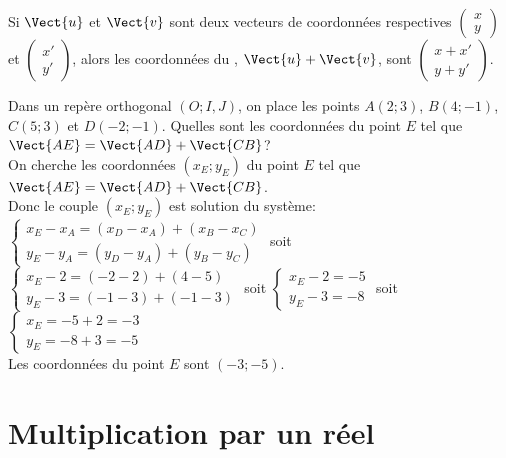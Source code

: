 \documentclass{book}
\begin{document}
\begin{Proposition}
Si $\Vect{u}$ et $\Vect{v}$ sont deux vecteurs de coordonnées respectives $\left (\begin{array}{c}
x\\y
\end{array}\right)$ et 
$\left(\begin{array}{c}
x'\\y'
\end{array}\right)$,
alors les coordonnées du , $\Vect{u}+\Vect{v}$, sont 
$\left(\begin{array}{c}
x+x'\\y+y'
\end{array}\right)$.
\end{Proposition}

\begin{Methode}
Dans un repère orthogonal $(O; I, J)$, on place les points $A(2;3)$, $B(4;-1)$, $C(5;3)$ et $D(-2;-1)$.
Quelles sont les coordonnées du point $E$ tel que $\Vect{AE}=\Vect{AD}+\Vect{CB}$?\\
On cherche les coordonnées $(x_E;y_E)$ du point $E$ tel que  $\Vect{AE}=\Vect{AD}+\Vect{CB}$. \\
Donc le couple $(x_E;y_E)$ est solution du système:
$\left\lbrace\begin{array}{l}
x_E-x_A=(x_D-x_A)+(x_B-x_C)\\y_E-y_A=(y_D-y_A)+(y_B-y_C)
\end{array}\right.$
soit 
$\left \lbrace \begin{array}{l}
x_E-2=(-2-2)+(4-5)\\y_E-3=(-1-3)+(-1-3)
\end{array}
\right.$ 
soit 
$\left \lbrace \begin{array}{l}
x_E-2=-5 \\y_E-3=-8
\end{array}
\right.$ 
soit 
$\left \lbrace \begin{array}{l}
x_E=-5+2=-3 \\y_E=-8+3=-5
\end{array}
\right.$\\
Les coordonnées du point $E$ sont $(-3;-5)$.
\end{Methode}




\section{Multiplication par un réel}
\end{document}
